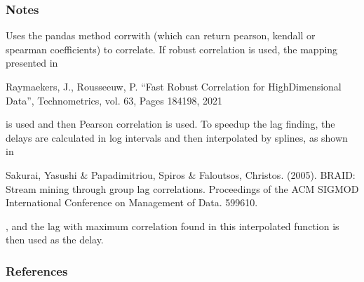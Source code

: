 \documentclass[letterpaper,10pt,english]{sphinxmanual}
\begin{document}
\begin{fulllineitems}
\begin{quote}
\begin{description}
\end{description}\end{quote}
\subsubsection*{Notes}

\sphinxAtStartPar
Uses the pandas method corrwith (which can return pearson, kendall or spearman coefficients) to correlate. If robust
correlation is used, the mapping presented in \sphinxstepexplicit %
\begin{footnote}[1]\label{\thesphinxscope.1}%
\sphinxAtStartFootnote
Raymaekers, J., Rousseeuw, P. “Fast Robust Correlation for High\sphinxhyphen{}Dimensional Data”, Technometrics, vol. 63, Pages 184\sphinxhyphen{}198, 2021
%
\end{footnote} is used and then Pearson correlation is used. To speedup the lag finding,
the delays are calculated in log intervals and then interpolated by splines, as shown in \sphinxstepexplicit %
\begin{footnote}[2]\label{\thesphinxscope.2}%
\sphinxAtStartFootnote
Sakurai, Yasushi \& Papadimitriou, Spiros \& Faloutsos, Christos. (2005). BRAID: Stream mining through group lag correlations. Proceedings of the ACM SIGMOD International Conference on Management of Data. 599\sphinxhyphen{}610.
%
\end{footnote}, and the lag with maximum correlation
found in this interpolated function is then used as the delay.
\subsubsection*{References}

\end{fulllineitems}

\end{document}
